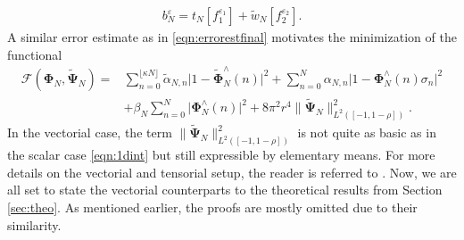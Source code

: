 \documentclass[a4paper, 10pt]{article}
\numberwithin{equation}{section}
\theoremstyle{definition}
\newcommand{\eps}{\ensuremath{\varepsilon}}
\begin{document}
\begin{align}\label{eqn:approxbj3}
{b_N^{\eps}={t}_{N}[f_1^{\eps_1}]+\tilde{{w}}_{N}[f_2^{\eps_2}].}
\end{align}
A similar error estimate as in \eqref{eqn:errorestfinal} motivates the minimization of the functional
\begin{equation}\label{eqn:mineq4}
{\begin{aligned}
\mathcal{F}(\mathbf{\Phi}_N,\tilde{\mathbf{\Psi}}_N)=&\sum_{n=0}^{\lfloor\kappa N\rfloor}\tilde{\alpha}_{N,n}\big|1-\tilde{\mathbf{\Phi}}_{N}^\wedge(n)\big|^2+\sum_{n=0}^{N}\alpha_{N,n}\big|1-{\mathbf{\Phi}}_{N}^\wedge(n)\sigma_n\big|^2
\\&+\beta_N\sum_{n=0}^{N}\big|\mathbf{\Phi}_N^\wedge(n)\big|^2+8\pi^2 r^4\big\|\tilde{\mathbf{\Psi}}_N\big\|^2_{L^2([-1,1-\rho])}.
\end{aligned}}
\end{equation}
In the vectorial case, the term $\|\tilde{\mathbf{\Psi}}_N\|^2_{L^2([-1,1-\rho])}$ is not quite as basic as in the scalar case \eqref{eqn:1dint} but still expressible by elementary means. For more details on the vectorial and tensorial setup, the reader is referred to \cite{freeschrei09}. Now, we are all set to state the vectorial counterparts to the theoretical results from Section \ref{sec:theo}. As mentioned earlier, the proofs are mostly omitted due to their similarity. 
\end{document}
